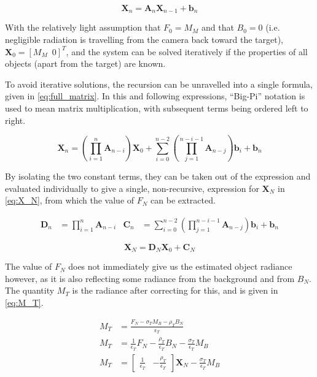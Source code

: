\documentclass[11pt,a4paper]{article}
\begin{document}
\begin{equation}\label{eq:mat}
	\bm{X}_{n} = \bm{A}_n \bm{X}_{n-1} + \bm{b}_n
\end{equation}

With the relatively light assumption that $ F_0 = M_M $ and that $ B_0 = 0 $ (i.e. negligible radiation is travelling from the camera back toward the target), $ \bm{X}_0 = \left[ M_M \enspace 0\right]^T$, and the system can be solved iteratively if the properties of all objects (apart from the target) are known.

To avoid iterative solutions, the recursion can be unravelled into a single formula, given in \cref{eq:full_matrix}. In this and following expressions, ``Big-Pi'' notation is used to mean matrix multiplication, with subsequent terms being ordered left to right.

\begin{equation}\label{eq:full_matrix}
	\bm{X}_n = \left(\prod_{i=1}^n \bm{A}_{n-i}\right) \bm{X}_0 + \sum_{i=0}^{n-2} \left( \prod_{j=1}^{n-i-1} \bm{A}_{n-j} \right) \bm{b}_i + \bm{b}_n
\end{equation}

By isolating the two constant terms, they can be taken out of the expression and evaluated individually to give a single, non-recursive, expression for $ \bm{X}_N $ in \cref{eq:X_N}, from which the value of $ F_N $ can be extracted.

\begin{align*}
	\bm{D}_n &= \prod_{i=1}^n \bm{A}_{n-i} &
	\bm{C}_n &= \sum_{i=0}^{n-2} \left( \prod_{j=1}^{n-i-1} \bm{A}_{n-j} \right) \bm{b}_i + \bm{b}_n
\end{align*}

\begin{equation}\label{eq:X_N}
\bm{X}_{N} = \bm{D}_N \bm{X}_0 + \bm{C}_N
\end{equation}

The value of $ F_N $ does not immediately give us the estimated object radiance however, as it is also reflecting some radiance from the background and from $ B_N $. The quantity $ M_T $ is the radiance after correcting for this, and is given in \cref{eq:M_T}.

\begin{align}
	M_T &= \frac{F_N - \sigma_T M_B - \rho_T B_N}{\epsilon_T} \nonumber\\
	M_T &= \frac{1}{\epsilon_T} F_N - \frac{\rho_T}{\epsilon_T} B_N - \frac{\sigma_T}{\epsilon_T} M_B \nonumber\\
	M_T &= \begin{bmatrix} \frac{1}{\epsilon_T} & - \frac{\rho_T}{\epsilon_T} \end{bmatrix} \bm{X}_{N} - \frac{\sigma_T}{\epsilon_T} M_B \label{eq:M_T}
\end{align}
\end{document}
